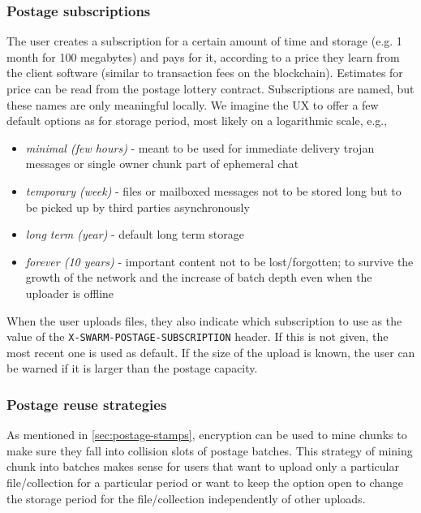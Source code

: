 \subsubsection{Postage subscriptions}

The user creates a subscription for a certain amount of time and storage (e.g. 1 month for 100 megabytes) and pays for it, according to a price they learn from the client software (similar to transaction fees on the blockchain). Estimates for price can be read from the postage lottery contract. Subscriptions are named, but these names are only meaningful locally. We imagine the UX to offer a few default options as for storage period, most likely on a logarithmic scale, e.g., 

\begin{itemize}
\item \emph{minimal (few hours)} - meant to be used for immediate delivery trojan messages or single owner chunk part of ephemeral chat 
\item \emph{temporary (week)} - files or mailboxed messages not to be stored long but to be picked up by third parties asynchronously
\item \emph{long term (year)} - default long term storage 
\item \emph{forever (10 years)} - important content not to be lost/forgotten; to survive the growth of the network and the increase of batch depth even when the uploader is offline
\end{itemize}

When the user uploads files, they also indicate which subscription to use as the value of the \texttt{X-SWARM-POSTAGE-SUBSCRIPTION} header. If this is not given, the most recent one is used as default. If the size of the upload is known, the user can be warned if it is larger than the postage capacity. 

\subsubsection{Postage reuse strategies}

As mentioned in \ref{sec:postage-stamps}, encryption can be used to mine chunks to make sure they fall into collision slots of postage batches. This strategy of mining chunk into batches makes sense for users that want to upload only a particular file/collection for a particular period or want to keep the option open to change the  storage period for the file/collection independently of other uploads.

